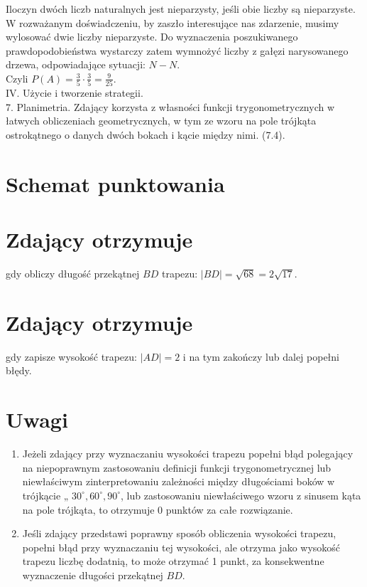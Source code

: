 \documentclass[10pt]{article}
\begin{document}
Iloczyn dwóch liczb naturalnych jest nieparzysty, jeśli obie liczby są nieparzyste. W rozważanym doświadczeniu, by zaszło interesujące nas zdarzenie, musimy wylosować dwie liczby nieparzyste. Do wyznaczenia poszukiwanego prawdopodobieństwa wystarczy zatem wymnożyć liczby z gałęzi narysowanego drzewa, odpowiadające sytuacji: $N-N$.\\
Czyli $P(A)=\frac{3}{5} \cdot \frac{3}{5}=\frac{9}{25}$.\\
IV. Użycie i tworzenie strategii.\\
7. Planimetria. Zdający korzysta z własności funkcji trygonometrycznych w łatwych obliczeniach geometrycznych, w tym ze wzoru na pole trójkąta ostrokątnego o danych dwóch bokach i kącie między nimi. (7.4).

\section*{Schemat punktowania}
\section*{Zdający otrzymuje}
gdy obliczy długość przekątnej $B D$ trapezu: $|B D|=\sqrt{68}=2 \sqrt{17}$.

\section*{Zdający otrzymuje}
gdy zapisze wysokość trapezu: $|A D|=2$ i na tym zakończy lub dalej popełni błędy.

\section*{Uwagi}
\begin{enumerate}
  \item Jeżeli zdający przy wyznaczaniu wysokości trapezu popełni błąd polegający na niepoprawnym zastosowaniu definicji funkcji trygonometrycznej lub niewłaściwym zinterpretowaniu zależności między długościami boków w trójkącie „ $30^{\circ}, 60^{\circ}, 90^{\circ}$, lub zastosowaniu niewłaściwego wzoru z sinusem kąta na pole trójkąta, to otrzymuje 0 punktów za całe rozwiązanie.
  \item Jeśli zdający przedstawi poprawny sposób obliczenia wysokości trapezu, popełni błąd przy wyznaczaniu tej wysokości, ale otrzyma jako wysokość trapezu liczbę dodatnią, to może otrzymać 1 punkt, za konsekwentne wyznaczenie długości przekątnej $B D$.
\end{enumerate}
\end{document}
